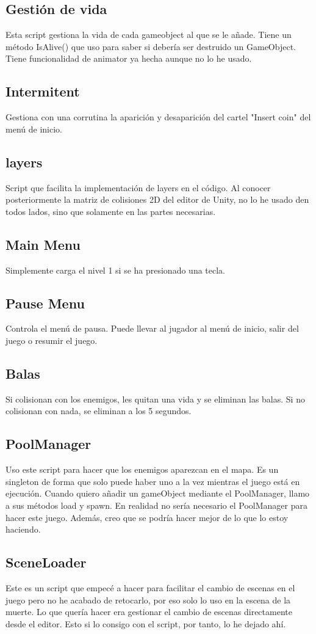 \documentclass[titlepage, 4apaper]{article}
\begin{document}
\subsection{Gestión de vida}
Esta script gestiona la vida de cada gameobject al que se le añade. Tiene un método IsAlive() que uso para saber si debería ser destruido un GameObject. Tiene funcionalidad de animator ya hecha aunque no lo he usado.
\subsection{Intermitent}
Gestiona con una corrutina la aparición y desaparición del cartel "Insert coin" del menú de inicio.
\subsection{layers}
Script que facilita la implementación de layers en el código. Al conocer posteriormente la matriz de colisiones 2D del editor de Unity, no lo he usado den todos lados, sino que solamente en las partes necesarias.
\subsection{Main Menu}
Simplemente carga el nivel 1 si se ha presionado una tecla.
\subsection{Pause Menu}
Controla el menú de pausa. Puede llevar al jugador al menú de inicio, salir del juego o resumir el juego.
\subsection{Balas}
Si colisionan con los enemigos, les quitan una vida y se eliminan las balas. Si no colisionan con nada, se eliminan a los 5 segundos.
\subsection{PoolManager}
Uso este script para hacer que los enemigos aparezcan en el mapa. Es un singleton de forma que solo puede haber uno a la vez mientras el juego está en ejecución. Cuando quiero añadir un gameObject mediante el PoolManager, llamo a sus métodos load y spawn. En realidad no sería necesario el PoolManager para hacer este juego. Además, creo que se podría hacer mejor de lo que lo estoy haciendo.
\subsection{SceneLoader}
Este es un script que empecé a hacer para facilitar el cambio de escenas en el juego pero no he acabado de retocarlo, por eso solo lo uso en la escena de la muerte. Lo que quería hacer era gestionar el cambio de escenas directamente desde el editor. Esto si lo consigo con el script, por tanto, lo he dejado ahí.
\end{document}
